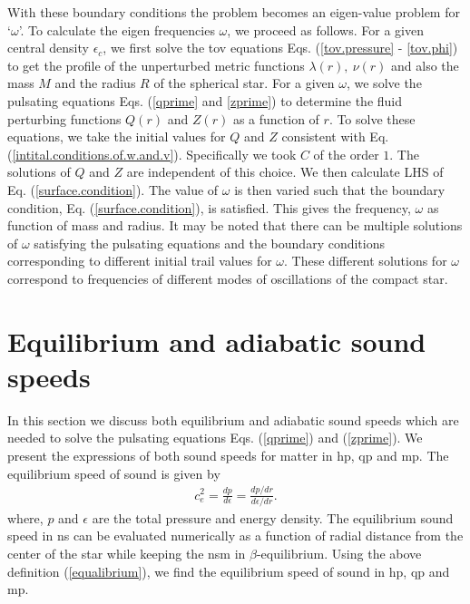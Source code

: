 \documentclass[a4paper, 11pt]{article}
\begin{document}
With these boundary conditions the problem becomes an eigen-value problem for `$\omega$'. To calculate the eigen frequencies $\omega$, we proceed as follows. For a given central density $\epsilon_c$, we first solve the \ac{tov} equations Eqs. (\ref{tov.pressure} - \ref{tov.phi}) to get the profile of the unperturbed metric functions $\lambda(r),~\nu(r)$ and also the mass $M$ and the radius $R$ of the spherical star. For a given $\omega$, we solve the pulsating equations Eqs. (\ref{qprime} and \ref{zprime}) to determine the fluid perturbing functions $Q(r)$ and $Z(r)$ as a function of $r$. To solve these equations, we take the initial values for $Q$ and $Z$ consistent with Eq. (\ref{intital.conditions.of.w.and.v}). Specifically we took $C$ of the order $1$. The solutions of $Q$ and $Z$ are independent of this choice. We then calculate LHS of  Eq. (\ref{surface.condition}). The value of $\omega$ is then varied such that the boundary condition, Eq. (\ref{surface.condition}), is satisfied. This gives the frequency, $\omega$ as function of mass and radius. It may be noted that there can be multiple solutions of $\omega$ satisfying the pulsating equations and the boundary conditions corresponding to different initial trail values for $\omega$. These different solutions for $\omega$ correspond to frequencies of different modes of oscillations of the compact star.





\section{Equilibrium and adiabatic sound speeds} \label{equalibrium.and.adiabatic.sound.speeds}
In this section we discuss both equilibrium and adiabatic sound speeds which are needed to solve the pulsating equations Eqs. (\ref{qprime}) and (\ref{zprime}). We present the  expressions of both sound speeds for matter in \ac{hp}, \ac{qp} and \ac{mp}. The equilibrium speed of sound is given by
\begin{eqnarray}
c_e^2=\frac{dp}{d\epsilon}=\frac{dp/dr}{d\epsilon/dr}. \label{equalibrium}
\end{eqnarray}
where, $p$ and $\epsilon$ are the total pressure and energy density. The equilibrium sound speed in \ac{ns} can be evaluated numerically as a function of radial distance from the center of the star while keeping the \ac{nsm} in $\beta$-equilibrium. Using the above definition (\ref{equalibrium}), we find the equilibrium speed of sound in \ac{hp}, \ac{qp} and \ac{mp}.
\end{document}

